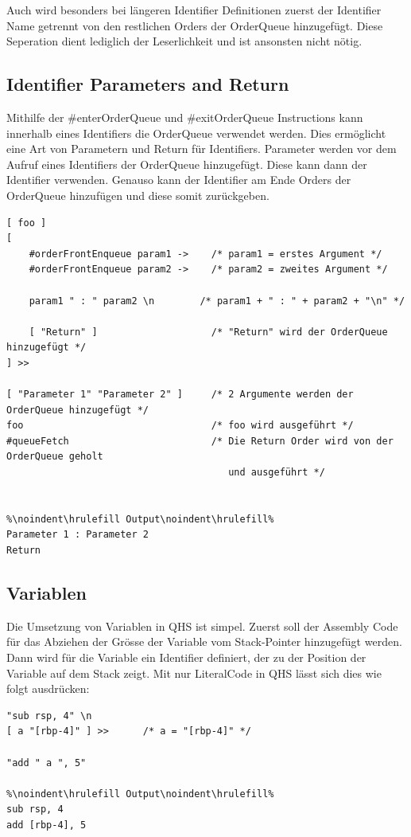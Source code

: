 Auch wird besonders bei längeren Identifier Definitionen zuerst der Identifier Name getrennt von den restlichen Orders der OrderQueue hinzugefügt. Diese Seperation dient lediglich der Leserlichkeit und ist ansonsten nicht nötig.

\subsection{Identifier Parameters and Return}
Mithilfe der \#enterOrderQueue und \#exitOrderQueue Instructions kann innerhalb eines Identifiers die OrderQueue verwendet werden. Dies ermöglicht eine Art von Parametern und Return für Identifiers.
Parameter werden vor dem Aufruf eines Identifiers der OrderQueue hinzugefügt. Diese kann dann der Identifier verwenden. Genauso kann der Identifier am Ende Orders der OrderQueue hinzufügen und diese somit zurückgeben.

\begin{lstlisting}[language=QHS, caption=Parameter und Return eines Identifiers]
[ foo ]
[
    #orderFrontEnqueue param1 ->    /* param1 = erstes Argument */
    #orderFrontEnqueue param2 ->    /* param2 = zweites Argument */

    param1 " : " param2 \n        /* param1 + " : " + param2 + "\n" */

    [ "Return" ]                    /* "Return" wird der OrderQueue hinzugefügt */
] >>

[ "Parameter 1" "Parameter 2" ]     /* 2 Argumente werden der OrderQueue hinzugefügt */
foo                                 /* foo wird ausgeführt */
#queueFetch                         /* Die Return Order wird von der OrderQueue geholt
                                       und ausgeführt */


%\noindent\hrulefill Output\noindent\hrulefill%
Parameter 1 : Parameter 2
Return
\end{lstlisting}


\subsection{Variablen} \label{sec:qhs-vars}
Die Umsetzung von Variablen in QHS ist simpel. Zuerst soll der Assembly Code für das Abziehen der Grösse der Variable vom Stack-Pointer hinzugefügt werden.
Dann wird für die Variable ein Identifier definiert, der zu der Position der Variable auf dem Stack zeigt.
Mit nur LiteralCode in QHS lässt sich dies wie folgt ausdrücken:

\begin{lstlisting}[language=QHS, caption=Definition einer Variable mit viel LiteralCode]
"sub rsp, 4" \n
[ a "[rbp-4]" ] >>      /* a = "[rbp-4]" */

"add " a ", 5"

%\noindent\hrulefill Output\noindent\hrulefill%
sub rsp, 4
add [rbp-4], 5
\end{lstlisting}


